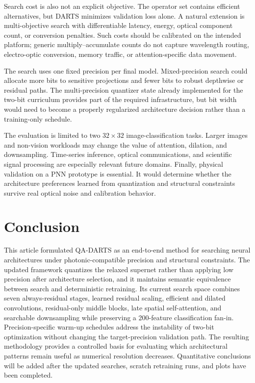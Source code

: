 \documentclass[lettersize,journal]{IEEEtran}
\begin{document}
Search cost is also not an explicit objective. The operator set contains efficient alternatives, but DARTS minimizes validation loss alone. A natural extension is multi-objective search with differentiable latency, energy, optical component count, or conversion penalties. Such costs should be calibrated on the intended platform; generic multiply--accumulate counts do not capture wavelength routing, electro-optic conversion, memory traffic, or attention-specific data movement.

The search uses one fixed precision per final model. Mixed-precision search could allocate more bits to sensitive projections and fewer bits to robust depthwise or residual paths. The multi-precision quantizer state already implemented for the two-bit curriculum provides part of the required infrastructure, but bit width would need to become a properly regularized architecture decision rather than a training-only schedule.

The evaluation is limited to two $32\times32$ image-classification tasks. Larger images and non-vision workloads may change the value of attention, dilation, and downsampling. Time-series inference, optical communications, and scientific signal processing are especially relevant future domains. Finally, physical validation on a PNN prototype is essential. It would determine whether the architecture preferences learned from quantization and structural constraints survive real optical noise and calibration behavior.

\section{Conclusion}
This article formulated QA-DARTS as an end-to-end method for searching neural architectures under photonic-compatible precision and structural constraints. The updated framework quantizes the relaxed supernet rather than applying low precision after architecture selection, and it maintains semantic equivalence between search and deterministic retraining. Its current search space combines seven always-residual stages, learned residual scaling, efficient and dilated convolutions, residual-only middle blocks, late spatial self-attention, and searchable downsampling while preserving a 200-feature classification fan-in. Precision-specific warm-up schedules address the instability of two-bit optimization without changing the target-precision validation path. The resulting methodology provides a controlled basis for evaluating which architectural patterns remain useful as numerical resolution decreases. Quantitative conclusions will be added after the updated searches, scratch retraining runs, and plots have been completed.
\end{document}
